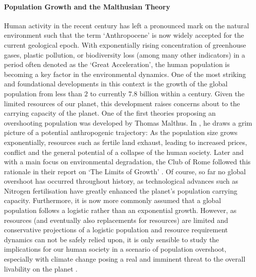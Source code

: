 \paragraph{Population Growth and the Malthusian Theory}
Human activity in the recent century has left a pronounced mark on the natural environment such that the term `Anthropocene' is now widely accepted for the current geological epoch.
With exponentially rising concentration of greenhouse gases, plastic pollution, or biodiversity loss (among many other indicators) in a period often denoted as the `Great Acceleration', the human population is becoming a key factor in the environmental dynamics.
One of the most striking and foundational developments in this context is the growth of the global population from less than $2$ to currently $7.8$ billion within a century. 
Given the limited resources of our planet, this development raises concerns about to the carrying capacity of the planet. %
One of the first theories proposing an overshooting population was developed by Thomas Malthus.
In \citet{Malthus1798}, he draws a grim picture of a potential anthropogenic trajectory: As the population size grows exponentially, resources such as fertile land exhaust,
leading to increased prices, conflict and the general potential of a collapse of the human society.
Later and with a main focus on environmental degradation, the Club of Rome followed this rationale in their report on `The Limits of Growth' \citep{clubofrome1972}.
Of course, so far no global overshoot has occurred throughout history, as technological advances such as Nitrogen fertilisation have greatly enhanced the planet's population carrying capacity.
Furthermore, it is now more commonly assumed that a global population follows a logistic rather than an exponential growth. 
However, as resources (and eventually also replacements for resources) are limited and conservative projections of a logistic population and resource requirement dynamics can not be safely relied upon, it is only sensible to study the implications for our human society in a scenario of population overshoot, especially with climate change posing a real and imminent threat to the overall livability on the planet \citep{Reuveny2012}.



